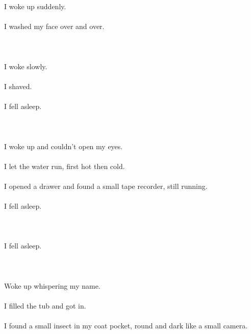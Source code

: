 \documentclass{article}
\begin{document}
    
    \section{}
    I woke up suddenly.\\\\I washed my face over and over.\\\\ 
    \newpage
    
    \section{}
    I woke slowly.\\\\I shaved.\\\\I fell asleep.\\\\ 
    \newpage
    
    \section{}
    I woke up and couldn't open my eyes.\\\\I let the water run, first hot then cold.\\\\I opened a drawer and found a small tape recorder, still running.\\\\I fell asleep.\\\\ 
    \newpage
    
    \section{}
    I fell asleep.\\\\ 
    \newpage
    
    \section{}
    Woke up whispering my name.\\\\I filled the tub and got in.\\\\I found a small insect in my coat pocket, round and dark like a small camera.\\\\ 
    \newpage
    
\end{document}
